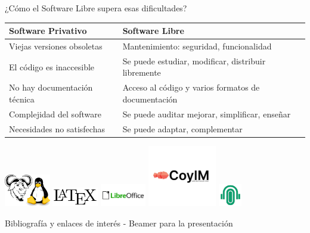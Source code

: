 \documentclass[spanish]{beamer}
\begin{document}
\begin{frame}{¿Cómo el Software Libre supera esas dificultades?}
    
    
    
    \centering
    \resizebox{12cm}{!}
    {
    \begin{tabular}{|l|l|}
        \hline        
        \rowcolor{lightgray}\textbf{Software Privativo} & \textbf{Software Libre}\\ 
        \hline
        \hline
        Viejas versiones obsoletas & Mantenimiento: seguridad, funcionalidad \\ 
        \hline
        El código es inaccesible & Se puede estudiar, modificar, distribuir libremente \\
        \hline
        No hay documentación técnica & Acceso al código y varios formatos de documentación \\
        \hline
        Complejidad del software & Se puede auditar \MVRightArrow{} mejorar, simplificar, enseñar \\
        \hline
        Necesidades no satisfechas & Se puede adaptar, complementar \\
        \hline
    \end{tabular}
    }

    \includegraphics[width=2cm]{img/GNU_and_Tux.jpg}
    \includegraphics[width=2cm]{img/latex.jpg}
    \includegraphics[width=2cm]{img/libreoffice.png}
    \includegraphics[width=3cm]{img/coyim.jpeg}
    \includegraphics[width=1cm]{img/wahay.jpg}
    
    
\end{frame}

\begin{frame}{Bibliografía y enlaces de interés}
    - Beamer para la presentación

    
\end{frame}
\end{document}
